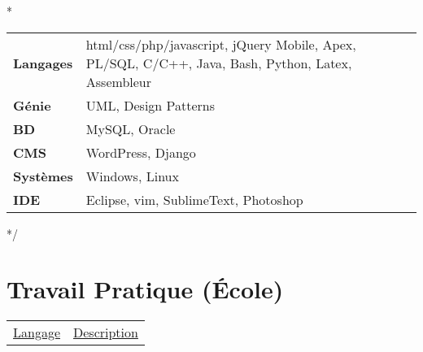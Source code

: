 \documentclass[a4paper,10pt]{extarticle}
\begin{document}
\/*
\begin{tabular}{ll}
\textbf{Langages} & 
html/css/php/javascript, jQuery Mobile, Apex, PL/SQL, C/C++, Java, Bash, Python,    Latex, Assembleur  \\
\textbf{Génie} &
UML, Design Patterns\\
\textbf{BD} & MySQL, Oracle \\
\textbf{CMS} & WordPress, Django \\
\textbf{Systèmes} & Windows, Linux \\
\textbf{IDE} & Eclipse, vim, SublimeText, Photoshop
\end{tabular}
*/
\begin{comment}
\begin{tabular*}{\linewidth}{
				   p{\dimexpr 0.15\linewidth-1\tabcolsep }  
                   p{\dimexpr 0.25\linewidth-1\tabcolsep } 
                   p{\dimexpr 0.25\linewidth-1\tabcolsep }  
                   p{\dimexpr 0.25\linewidth-1\tabcolsep } 
                   } 
   		         & Programmation & Web/Framework & BD \vspace{1.5em}\tabularnewline
À l'aise		 &               &   Django,WordPress            & \tabularnewline[10ex]
Très à l'aise 	 &               &   Ruby on rails           & \tabularnewline[10ex]
Mon best         & Java \newline C\#  & & \tabularnewline[10ex]
\end{tabular*}
\end{comment}
\clearpage














\section{Travail Pratique \small (École)}
\begin{tabular*}{\textwidth}{p{ }
						 	 p{ }} 
\centering\underline{Langage} &\centering\underline{Description}
\end{tabular*}\vspace{-1em}
\\\\
\end{document}
